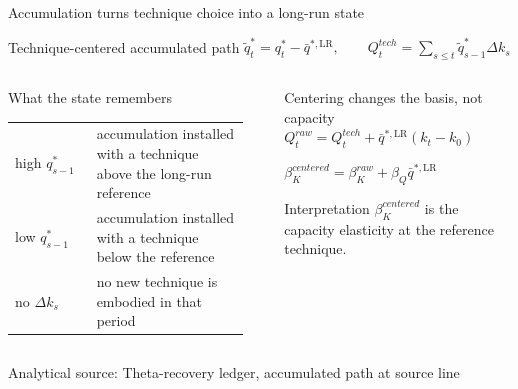 \documentclass[10pt,aspectratio=169]{beamer}
\newcommand{\LR}{\mathrm{LR}}
\newcommand{\sourcefooter}[1]{%
  \par\vfill{\tiny\color{gray!70}Analytical source: #1}\vspace{-0.35em}}
\begin{document}
\begin{frame}{Accumulation turns technique choice into a long-run state}
  \begin{block}{Technique-centered accumulated path}
    \centering
    $\displaystyle
    \widetilde q_t^*=q_t^*-\bar q^{*,\LR},
    \qquad
    Q_t^{tech}=\sum_{s\le t}\widetilde q_{s-1}^*\Delta k_s$
  \end{block}
  \begin{columns}[T,onlytextwidth]
    \begin{column}{0.49\textwidth}
      \begin{block}{What the state remembers}
        \small
        \begin{tabular}{@{}L{0.32\linewidth}L{0.60\linewidth}@{}}
          high $q_{s-1}^*$ & accumulation installed with a technique above the long-run reference \\
          \addlinespace[0.6em]
          low $q_{s-1}^*$ & accumulation installed with a technique below the reference \\
          \addlinespace[0.6em]
          no $\Delta k_s$ & no new technique is embodied in that period
        \end{tabular}
      \end{block}
    \end{column}
    \begin{column}{0.48\textwidth}
      \begin{block}{Centering changes the basis, not capacity}
        \small
        $\displaystyle
        Q_t^{raw}
        =Q_t^{tech}+\bar q^{*,\LR}(k_t-k_0)$

        \vspace{0.5em}
        $\displaystyle
        \beta_K^{centered}
        =\beta_K^{raw}+\beta_Q\bar q^{*,\LR}$
      \end{block}
      \begin{alertblock}{Interpretation}
        $\beta_K^{centered}$ is the capacity elasticity at the reference technique.
      \end{alertblock}
    \end{column}
  \end{columns}
  \sourcefooter{Theta-recovery ledger, accumulated path at source line \LineAccumulatedPath}
\end{frame}
\end{document}

